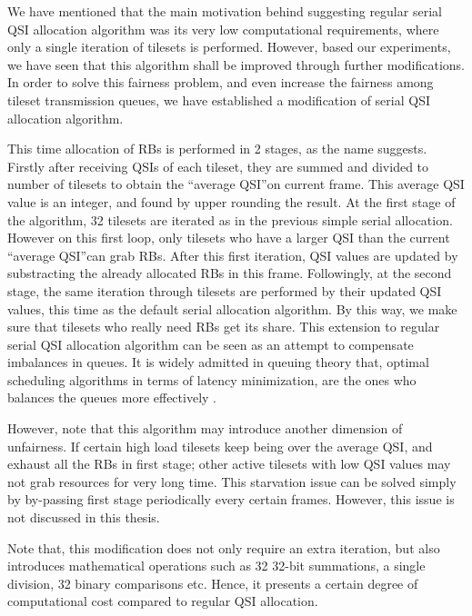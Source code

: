 We have mentioned that the main motivation behind suggesting regular serial QSI allocation algorithm was its very low computational requirements, where only a single iteration of tilesets is performed. However, based our experiments, we have seen that this algorithm shall be improved through further modifications. In order to solve this fairness problem, and even increase the fairness among tileset transmission queues, we have established a modification of serial QSI allocation algorithm. 

This time allocation of RBs is performed in 2 stages, as the name suggests. Firstly after receiving QSIs of each tileset, they are summed and divided to number of tilesets to obtain the \textquotedblleft average QSI\textquotedblright on current frame. This average QSI value is an integer, and found by upper rounding the result. At the first stage of the algorithm, 32 tilesets are iterated as in the previous simple serial allocation. However on this first loop, only tilesets who have a larger QSI than the current \textquotedblleft average QSI\textquotedblright can grab RBs. After this first iteration, QSI values are updated by substracting the already allocated RBs in this frame. Followingly, at the second stage, the same iteration through tilesets are performed by their updated QSI values, this time as the default serial allocation algorithm. By this way, we make sure that tilesets who really need RBs get its share. This extension to regular serial QSI allocation algorithm can be seen as an attempt to compensate imbalances in queues. It is widely admitted in queuing theory that, optimal scheduling algorithms in terms of latency minimization, are the ones who balances the queues more effectively \cite{kittipiyakul2009delay}.

However, note that this algorithm may introduce another dimension of unfairness. If certain high load tilesets keep being over the average QSI, and exhaust all the RBs in first stage; other active tilesets with low QSI values may not grab resources for very long time. This starvation issue can be solved simply by by-passing first stage periodically every certain frames. However, this issue is not discussed in this thesis.

Note that, this modification does not only require an extra iteration, but also introduces mathematical operations such as 32 32-bit summations, a single division, 32 binary comparisons etc. Hence, it presents a certain degree of computational cost compared to regular QSI allocation.
 
